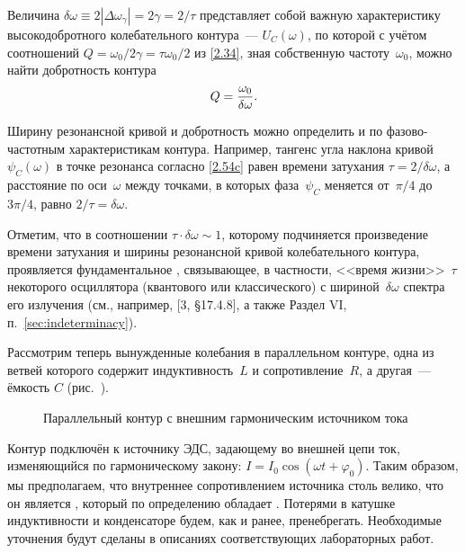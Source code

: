 Величина $\delta\omega\equiv2|\Delta\omega_{\gamma}|=2\gamma=2/\tau$
представляет собой важную характеристику высокодобротного колебательного
контура~---  $U_C(\omega)$, по которой с
учётом соотношений $Q=\omega_0/2\gamma=\tau\omega_0/2$ из \eqref{2.34}, зная
собственную частоту~$\omega_0$, можно найти добротность контура
\begin{equation}\eqmark{2.63}
Q=\dfrac{\omega_0}{\delta\omega}.
\end{equation}

Ширину резонансной кривой и добротность можно определить и по
фазово-частотным характеристикам контура. Например, тангенс угла наклона
кривой $\psi_C(\omega)$ в точке резонанса согласно \eqref{2.54c} равен времени
затухания $\tau=2/\delta\omega$, а расстояние по оси~$\omega$ между точками, в
которых фаза~$\psi_C$ меняется от~$\pi/4$ до~$3\pi/4$, равно
$2/\tau=\delta\omega$.

Отметим, что в соотношении $\tau\cdot\delta\omega\sim1$, которому
подчиняется произведение времени затухания и ширины резонансной кривой
колебательного контура, проявляется фундаментальное , связывающее, в частности, <<время жизни>>~$\tau$ 
некоторого осциллятора (квантового или классического) с шириной~$\delta\omega$ 
спектра его излучения 
(см., например, [3, \S17.4.8], а также Раздел VI, п.~\ref{sec:indeterminacy}).


\label{sec:ires}

Рассмотрим теперь вынужденные колебания в параллельном контуре, одна из ветвей
которого содержит индуктивность~$L$ и сопротивление~$R$, а другая~--- ёмкость
$C$ (рис.~).

\begin{figure}[h!]
		\centering
		\caption{Параллельный контур с внешним гармоническим источником тока}
\end{figure}

Контур подключён к источнику ЭДС, задающему во внешней цепи ток, изменяющийся по
гармоническому закону: $I=I_0\cos(\omega t+\varphi_0)$. Таким образом, мы
предполагаем, что внутреннее сопротивлением источника столь велико, что он
является , который по определению обладает
. Потерями в катушке
индуктивности и конденсаторе будем, как и ранее, пренебрегать. Необходимые
уточнения будут сделаны в описаниях соответствующих лабораторных работ.

